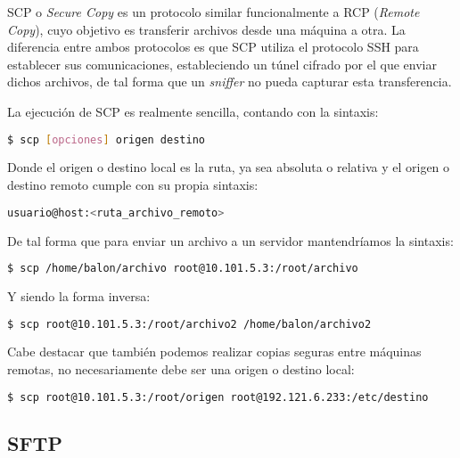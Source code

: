 \documentclass[a4paper, 11pt, titlepage]{article}
\begin{document}
        SCP o \textit{Secure Copy} es un protocolo similar funcionalmente a RCP (\textit{Remote Copy}), cuyo 
        objetivo es transferir archivos desde una máquina a otra. La diferencia entre ambos protocolos es que 
        SCP utiliza el protocolo SSH para establecer sus comunicaciones, estableciendo un túnel cifrado por el 
        que enviar dichos archivos, de tal forma que un \textit{sniffer} no pueda capturar esta transferencia.

        La ejecución de SCP es realmente sencilla, contando con la sintaxis:

        \begin{lstlisting}[language=bash,basicstyle=\footnotesize]
    $ scp [opciones] origen destino\end{lstlisting}

        Donde el origen o destino local es la ruta, ya sea absoluta o relativa y el origen o destino remoto 
        cumple con su propia sintaxis:

        \begin{lstlisting}[language=bash,basicstyle=\footnotesize]
    usuario@host:<ruta_archivo_remoto>\end{lstlisting}
        
        De tal forma que para enviar un archivo a un servidor mantendríamos la sintaxis:
      
        \begin{lstlisting}[language=bash,basicstyle=\footnotesize]
    $ scp /home/balon/archivo root@10.101.5.3:/root/archivo\end{lstlisting}

        Y siendo la forma inversa:

        \begin{lstlisting}[language=bash,basicstyle=\footnotesize]
    $ scp root@10.101.5.3:/root/archivo2 /home/balon/archivo2\end{lstlisting}

        Cabe destacar que también podemos realizar copias seguras entre máquinas remotas, no necesariamente 
        debe ser una origen o destino local:
        
        \begin{lstlisting}[language=bash,basicstyle=\tiny]
    $ scp root@10.101.5.3:/root/origen root@192.121.6.233:/etc/destino\end{lstlisting}

    \subsection{SFTP}
\end{document}
